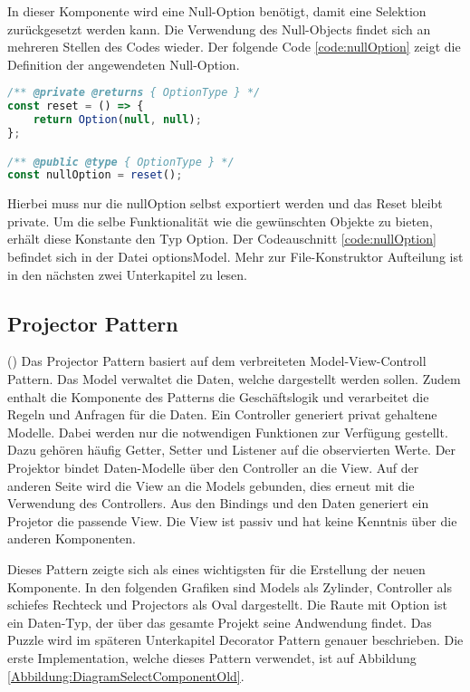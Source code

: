 In dieser Komponente wird eine Null-Option benötigt, damit eine Selektion zurückgesetzt werden kann.
Die Verwendung des Null-Objects findet sich an mehreren Stellen des Codes wieder.
Der folgende Code \ref{code:nullOption} zeigt die Definition der angewendeten Null-Option.

\begin{lstlisting}[language = js, caption = Null-Option, label = code:nullOption]
/** @private @returns { OptionType } */
const reset = () => {
    return Option(null, null);
};

/** @public @type { OptionType } */
const nullOption = reset();
\end{lstlisting}

Hierbei muss nur die nullOption selbst exportiert werden und das Reset bleibt private.
Um die selbe Funktionalität wie die gewünschten Objekte zu bieten, erhält diese Konstante den Typ Option.
Der Codeauschnitt \ref{code:nullOption} befindet sich in der Datei optionsModel.
Mehr zur File-Konstruktor Aufteilung ist in den nächsten zwei Unterkapitel zu lesen.

\subsection{Projector Pattern}

(\cite{projectorPattern}) Das Projector Pattern basiert auf dem verbreiteten Model-View-Controll Pattern.
Das Model verwaltet die Daten, welche dargestellt werden sollen.
Zudem enthalt die Komponente des Patterns die Geschäftslogik und verarbeitet die Regeln und Anfragen für die Daten.
Ein Controller generiert privat gehaltene Modelle.
Dabei werden nur die notwendigen Funktionen zur Verfügung gestellt.
Dazu gehören häufig Getter, Setter und Listener auf die observierten Werte.
Der Projektor bindet Daten-Modelle über den Controller an die View.
Auf der anderen Seite wird die View an die Models gebunden, dies erneut mit die Verwendung des Controllers.
Aus den Bindings und den Daten generiert ein Projetor die passende View.
Die View ist passiv und hat keine Kenntnis über die anderen Komponenten.

Dieses Pattern zeigte sich als eines wichtigsten für die Erstellung der neuen Komponente.
In den folgenden Grafiken sind Models als Zylinder, Controller als schiefes Rechteck und Projectors als Oval dargestellt.
Die Raute mit Option ist ein Daten-Typ, der über das gesamte Projekt seine Andwendung findet.
Das Puzzle wird im späteren Unterkapitel Decorator Pattern genauer beschrieben.
Die erste Implementation, welche dieses Pattern verwendet, ist auf Abbildung \ref{Abbildung:DiagramSelectComponentOld}.

